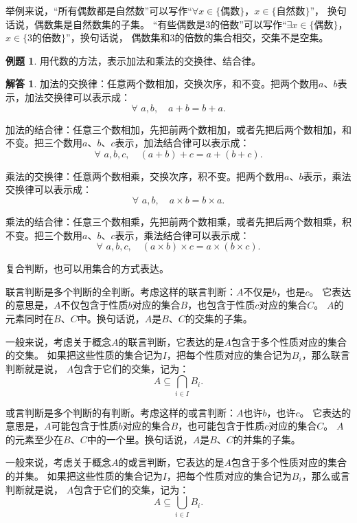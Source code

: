 \documentclass[12pt,UTF8]{ctexbook}
\theoremstyle{definition}
\newtheorem{et}{例题}[section]
\newtheorem*{so}{解答}
\theoremstyle{plain}
\begin{document}
举例来说，“所有偶数都是自然数”可以写作“$\forall x \in \{\mbox{偶数}\}$，$x \in \{\mbox{自然数}\}$”，
换句话说，偶数集是自然数集的子集。
“有些偶数是$3$的倍数”可以写作“$\exists x \in \{\mbox{偶数}\}$，$x \in \{3\mbox{的倍数}\}$”，换句话说，
偶数集和$3$的倍数的集合相交，交集不是空集。

\begin{et}
    用代数的方法，表示加法和乘法的交换律、结合律。
\end{et}

\begin{so}
    加法的交换律：任意两个数相加，交换次序，和不变。把两个数用$a$、$b$表示，加法交换律可以表示成：
    $$ \forall \,\, a, b, \quad a + b = b + a. $$
    
    加法的结合律：任意三个数相加，先把前两个数相加，或者先把后两个数相加，和不变。把三个数用$a$、$b$、$c$表示，加法结合律可以表示成：
    $$ \forall \,\, a, b, c, \quad (a + b) + c = a + (b + c). $$
    
    乘法的交换律：任意两个数相乘，交换次序，积不变。把两个数用$a$、$b$表示，乘法交换律可以表示成：
    $$ \forall \,\, a, b, \quad a \times b = b \times a. $$
    
    乘法的结合律：任意三个数相乘，先把前两个数相乘，或者先把后两个数相乘，积不变。把三个数用$a$、$b$、$c$表示，乘法结合律可以表示成：
    $$ \forall \,\, a, b, c, \quad (a \times b) \times c = a \times (b \times c). $$
\end{so}

复合判断，也可以用集合的方式表达。

联言判断是多个判断的全判断。考虑这样的联言判断：$A$不仅是$b$，也是$c$。
它表达的意思是，$A$不仅包含于性质$b$对应的集合$B$，也包含于性质$c$对应的集合$C$。
$A$的元素同时在$B$、$C$中。换句话说，$A$是$B$、$C$的交集的子集。

一般来说，考虑关于概念$A$的联言判断，它表达的是$A$包含于多个性质对应的集合的交集。
如果把这些性质的集合记为$I$，把每个性质对应的集合记为$B_i$，那么联言判断就是说，
$A$包含于它们的交集，记为：
$$ A \subseteq \bigcap_{i\in I} B_i. $$

或言判断是多个判断的有判断。考虑这样的或言判断：$A$也许$b$，也许$c$。
它表达的意思是，$A$可能包含于性质$b$对应的集合$B$，也可能包含于性质$c$对应的集合$C$。
$A$的元素至少在$B$、$C$中的一个里。换句话说，$A$是$B$、$C$的并集的子集。

一般来说，考虑关于概念$A$的或言判断，它表达的是$A$包含于多个性质对应的集合的并集。
如果把这些性质的集合记为$I$，把每个性质对应的集合记为$B_i$，那么或言判断就是说，
$A$包含于它们的交集，记为：
$$ A \subseteq \bigcup_{i\in I} B_i. $$
\end{document}
